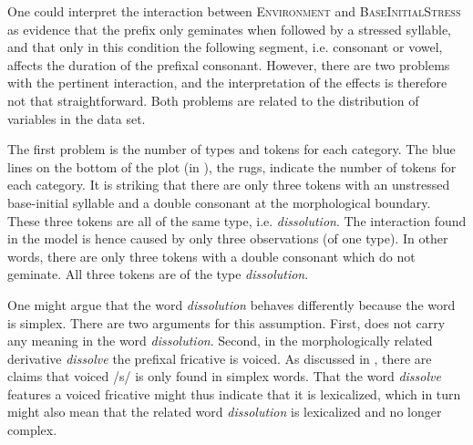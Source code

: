 


One could interpret the interaction between \textsc{Environment} and \textsc{BaseInitialStress} as evidence that the prefix  only geminates when followed by a stressed syllable, and that only in this condition the following segment, i.e. consonant or vowel, affects the duration of the prefixal consonant. However, there are two problems with the pertinent interaction, and the interpretation of the effects is therefore not that straightforward. Both problems are related to the distribution of variables in the data set. 

The first problem is the number of types and tokens for each category. The blue lines on the bottom of the plot (in ), the rugs, indicate the number of tokens for each category. It is striking that there are only three tokens with an unstressed base-initial syllable and a double consonant at the morphological boundary. These three tokens are all of the same type, i.e. \textit{dissolution}. The interaction found in the model is hence caused by only three observations (of one type). In other words, there are only three tokens with a double consonant which do not geminate. All three tokens are of the type \textit{dissolution}. 

One might argue that the word \textit{dissolution} behaves differently because the word is simplex. There are two arguments for this assumption. First,  does not carry any meaning in the word \textit{dissolution}. Second, in the morphologically related derivative \textit{dissolve} the prefixal fricative is voiced. As discussed in , there are claims that voiced /s/ is only found in simplex words. That the word \textit{dissolve} features a voiced fricative might thus indicate that it is lexicalized, which in turn might also mean that the related word \textit{dissolution} is lexicalized and no longer complex.

